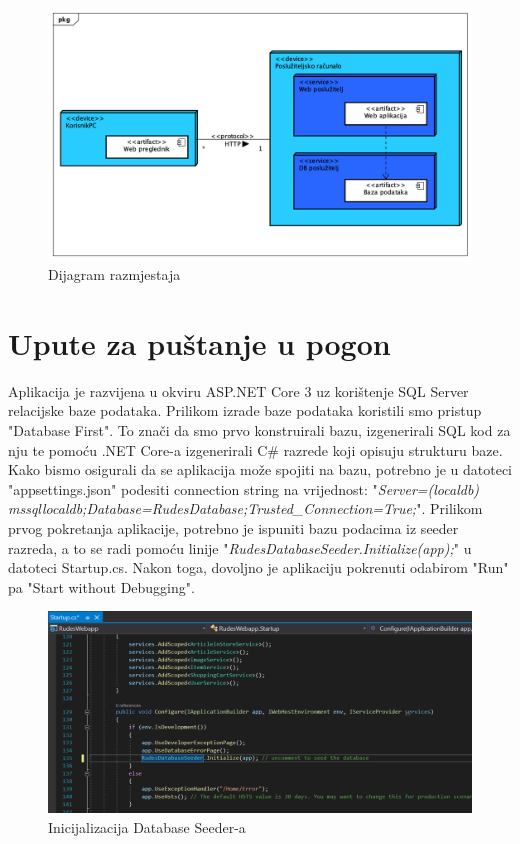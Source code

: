 			 \begin{figure}[H]
			 	\includegraphics[width=\linewidth]{dijagrami/Dijagram_razmjestaja.png}
			 	\centering
			 	\caption{Dijagram razmjestaja}
			 	\label{fig:ClassDiagram1}
			 \end{figure}
			
			\eject 
		
		\section{Upute za puštanje u pogon}
		

			 
			 \textnormal{Aplikacija je razvijena u okviru ASP.NET Core 3 uz korištenje SQL Server relacijske baze podataka. Prilikom izrade baze podataka koristili smo pristup "Database First". To znači da smo prvo konstruirali bazu, izgenerirali SQL kod za nju te pomoću .NET Core-a izgenerirali C\# razrede koji opisuju strukturu baze. Kako bismo osigurali da se aplikacija može spojiti na bazu, potrebno je u datoteci "appsettings.json" podesiti connection string na vrijednost: "\textit{Server=(localdb)\\mssqllocaldb;Database=RudesDatabase;Trusted\_Connection=True;}". Prilikom prvog pokretanja aplikacije, potrebno je ispuniti bazu podacima iz seeder razreda, a to se radi pomoću linije "\textit{RudesDatabaseSeeder.Initialize(app);}" u datoteci Startup.cs. Nakon toga, dovoljno je aplikaciju pokrenuti odabirom "Run" pa "Start without Debugging".}
			 
			 \begin{figure}[H]
			 	\includegraphics[width=\linewidth]{deployment/database_seeder.png}
			 	\centering
			 	\caption{Inicijalizacija Database Seeder-a}
			 	\label{fig:ClassDiagram1}
			 \end{figure}
			 
